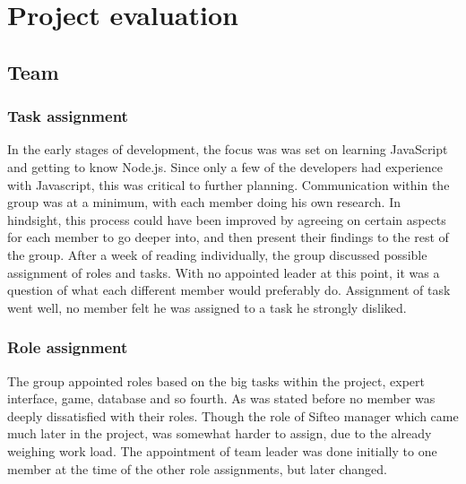 \chapter{Project evaluation}

\section{Team}

\subsection*{Task assignment}

In the early stages of development, the focus was was set on learning JavaScript and getting to know Node.js. Since only a few of the developers had experience with Javascript, this was critical to further planning. Communication within the group was at a minimum, with each member doing his own research. In hindsight, this process could have been improved by agreeing on certain aspects for each member to go deeper into, and then present their findings to the rest of the group. After a week of reading individually, the group discussed possible assignment of roles and tasks. With no appointed leader at this point, it was a question of what each different member would preferably do. Assignment of task went well, no member felt he was assigned to a task he strongly disliked.

\subsection*{Role assignment}

The group appointed roles based on the big tasks within the project, expert interface, game, database and so fourth. As was stated before no member was deeply dissatisfied with their roles. Though the role of Sifteo manager which came much later in the project, was somewhat harder to assign, due to the already weighing work load. The appointment of team leader was done initially to one member at the time of the other role assignments, but later changed. 

